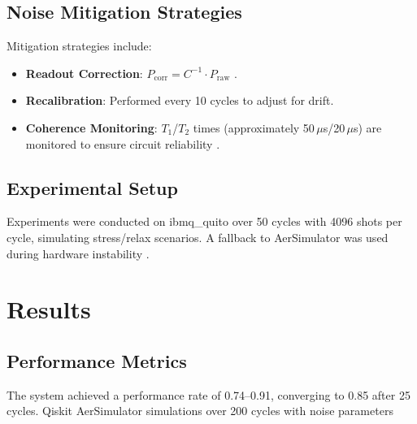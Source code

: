 \documentclass[12pt]{article}
\begin{document}
\subsection{Noise Mitigation Strategies}
Mitigation strategies include:
\begin{itemize}
    \item \textbf{Readout Correction}: $P_{\text{corr}} = C^{-1} \cdot P_{\text{raw}}$ \citep{ibmq2024}.
    \item \textbf{Recalibration}: Performed every 10 cycles to adjust for drift.
    \item \textbf{Coherence Monitoring}: $T_1$/$T_2$ times (approximately 50\,$\mu$s/20\,$\mu$s) are monitored to ensure circuit reliability \citep{bravyi2021mitigating}.
\end{itemize}

\subsection{Experimental Setup}
Experiments were conducted on ibmq\_quito over 50 cycles with 4096 shots per cycle, simulating stress/relax scenarios. A fallback to AerSimulator was used during hardware instability \citep{google2024quantum}.

\section{Results}

\subsection{Performance Metrics}
The system achieved a performance rate of 0.74--0.91, converging to 0.85 after 25 cycles. Qiskit AerSimulator simulations over 200 cycles with noise parameters
\end{document}
